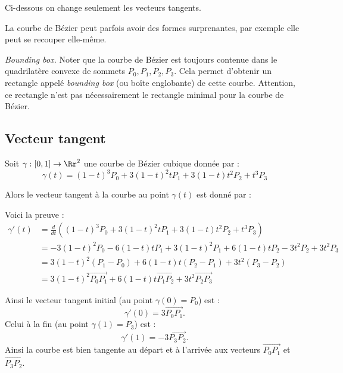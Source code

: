 \documentclass[11pt,class=report,crop=false]{standalone}
\begin{document}

Ci-dessous on change seulement les vecteurs tangents.


La courbe de Bézier peut parfois avoir des formes surprenantes, par exemple elle peut se recouper elle-même.



\emph{Bounding box.} Noter que la courbe de Bézier est toujours contenue dans le quadrilatère convexe de sommets $P_0,P_1,P_2,P_3$.
Cela permet d'obtenir un rectangle appelé \emph{bounding box} (ou boîte englobante) de cette courbe. Attention, ce rectangle 
n'est pas nécessairement le rectangle minimal pour la courbe de Bézier.


\subsection{Vecteur tangent}


Soit $\gamma : [0,1] \to \Rr^2$ une courbe de Bézier cubique donnée par :
$$\gamma(t) = (1-t)^3P_0 + 3(1-t)^2tP_1 + 3(1-t)t^2P_2 + t^3P_3$$

Alors le vecteur tangent à la courbe au point $\gamma(t)$ est donné par :

Voici la preuve :
\begin{align*}
\gamma'(t) 
  &= \frac{d}{dt} \left( (1-t)^3P_0 + 3(1-t)^2tP_1 + 3(1-t)t^2P_2 + t^3P_3 \right) \\
  &= -3(1-t)^2P_0 -6(1-t)t P_1 + 3(1-t)^2 P_1  + 6(1-t)t P_2 - 3t^2 P_2 + 3t^2P_3 \\
  &= 3(1-t)^2 (P_1-P_0) + 6(1-t)t (P_2-P_1) + 3t^2 (P_3-P_2) \\
  &= 3(1-t)^2 \vec{P_0P_1} + 6(1-t)t \vec{P_1P_2} + 3t^2 \vec{P_2P_3}
\end{align*}

Ainsi le vecteur tangent initial (au point $\gamma(0) = P_0$) est :
$$\gamma'(0) = 3 \vec{P_0P_1}.$$
Celui à la fin (au point $\gamma(1) = P_3$) est :
$$\gamma'(1) = -3 \vec{P_3P_2}.$$
Ainsi la courbe est bien tangente au départ et à l'arrivée aux vecteurs $\vec{P_0P_1}$ et $\vec{P_3P_2}$.
\end{document}
